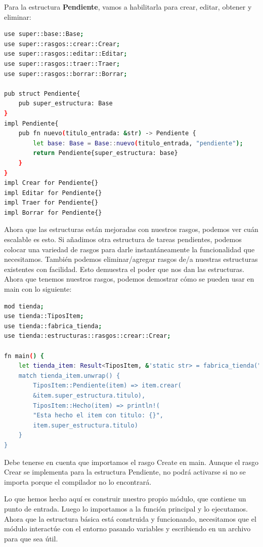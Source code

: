 Para la estructura\textbf{ Pendiente}, vamos a habilitarla para crear, editar, obtener y eliminar:

\begin{lstlisting}[language=bash]
use super::base::Base;
use super::rasgos::crear::Crear;
use super::rasgos::editar::Editar;
use super::rasgos::traer::Traer;
use super::rasgos::borrar::Borrar;

pub struct Pendiente{
	pub super_estructura: Base
}
impl Pendiente{
	pub fn nuevo(titulo_entrada: &str) -> Pendiente {
		let base: Base = Base::nuevo(titulo_entrada, "pendiente");
		return Pendiente{super_estructura: base}
	}
}
impl Crear for Pendiente{}
impl Editar for Pendiente{}
impl Traer for Pendiente{}
impl Borrar for Pendiente{}	
\end{lstlisting}

Ahora que las estructuras están mejoradas con nuestros rasgos, podemos ver cuán escalable es esto. Si añadimos otra estructura de tareas pendientes, podemos colocar una variedad de rasgos para darle instantáneamente la funcionalidad que necesitamos. También podemos eliminar/agregar rasgos de/a nuestras estructuras existentes con facilidad. Esto demuestra el poder que nos dan las estructuras. Ahora que tenemos nuestros rasgos, podemos demostrar cómo se pueden usar en main con lo siguiente:

\begin{lstlisting}[language=bash]
mod tienda;
use tienda::TiposItem;
use tienda::fabrica_tienda;
use tienda::estructuras::rasgos::crear::Crear;

fn main() {
	let tienda_item: Result<TiposItem, &'static str> = fabrica_tienda("pendiente", "lavando");
	match tienda_item.unwrap() {
		TiposItem::Pendiente(item) => item.crear(
		&item.super_estructura.titulo),
		TiposItem::Hecho(item) => println!(
		"Esta hecho el item con titulo: {}",
		item.super_estructura.titulo)	
	}	
}
\end{lstlisting}

Debe tenerse en cuenta que importamos el rasgo Create en main. Aunque el rasgo Crear se implementa para la estructura Pendiente, no podrá activarse si no se importa porque el compilador no lo encontrará.

Lo que hemos hecho aquí es construir nuestro propio módulo, que contiene un punto de entrada. Luego lo importamos a la función principal y lo ejecutamos. Ahora que la estructura básica está construida y funcionando, necesitamos que el módulo interactúe con el entorno pasando variables y escribiendo en un archivo para que sea útil.	


